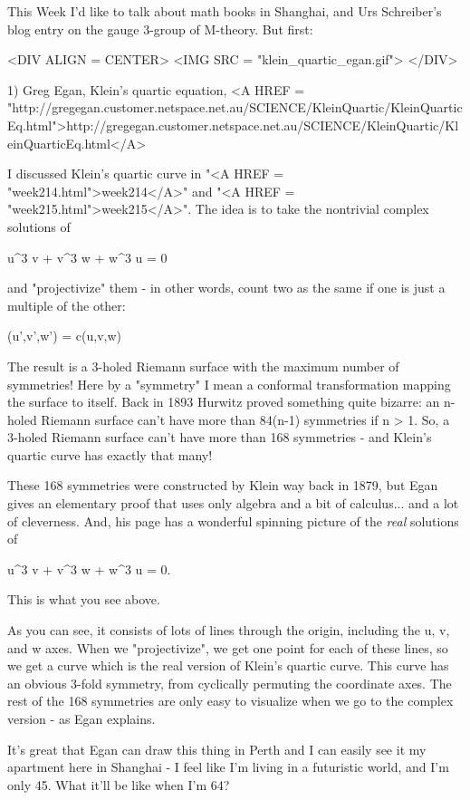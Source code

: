



This Week I'd like to talk about math books in Shanghai, 
and Urs Schreiber's blog entry on 
the gauge 3-group of M-theory.   But first:

<DIV ALIGN = CENTER>
<IMG SRC = "klein_quartic_egan.gif">
</DIV>

1) Greg Egan, Klein's quartic equation,
<A HREF = "http://gregegan.customer.netspace.net.au/SCIENCE/KleinQuartic/KleinQuarticEq.html">http://gregegan.customer.netspace.net.au/SCIENCE/KleinQuartic/KleinQuarticEq.html</A>

I discussed Klein's quartic curve in "<A HREF = "week214.html">week214</A>" and "<A HREF = "week215.html">week215</A>".
The idea is to take the nontrivial complex solutions of

u^{3} v + v^{3} w + w^{3} u = 0

and "projectivize" them - in other words, count two 
as the same if one is just a multiple of the other:

(u',v',w') = c(u,v,w)

The result is a 3-holed Riemann surface with the maximum number of
symmetries!  Here by a "symmetry" I mean a conformal
transformation mapping the surface to itself.  Back in 1893 Hurwitz
proved something quite bizarre: an n-holed Riemann surface can't
have more than 84(n-1) symmetries if n > 1.  So, a 3-holed Riemann
surface can't have more than 168 symmetries - and Klein's quartic
curve has exactly that many!

These 168 symmetries were constructed by Klein way back in 1879, 
but Egan gives an elementary proof that uses only algebra and a 
bit of calculus...  and a lot of cleverness.  And, his page has 
a wonderful spinning picture of the \emph{real} solutions of 

u^{3} v + v^{3} w + w^{3} u = 0.

This is what you see above.

As you can see, it consists of lots of lines through the origin,
including the u, v, and w axes.  When we "projectivize", we get 
one point for each of these lines, so we get a curve which is the 
real version of Klein's quartic curve.  This curve has an obvious 
3-fold symmetry, from cyclically permuting the coordinate axes.
The rest of the 168 symmetries are only easy to visualize when we go to 
the complex version - as Egan explains.  

It's great that Egan can draw this thing in Perth and I can easily
see it my apartment here in Shanghai - I feel like I'm living in a 
futuristic world, and I'm only 45.  What it'll be like when I'm 64?

